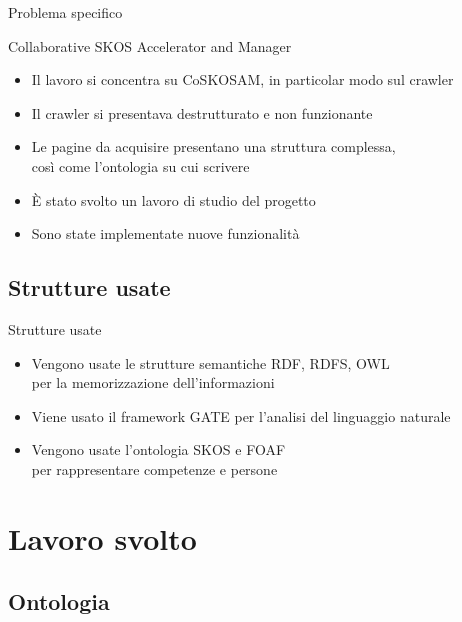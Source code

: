 \documentclass[dvips, 11pt]{beamer}
\begin{document}
\begin{frame}{Problema specifico}
  \begin{block}{Collaborative SKOS Accelerator and Manager}
    
  \end{block}
  \begin{itemize}
  \item Il lavoro si concentra su \alert{CoSKOSAM}, in particolar modo sul \alert{crawler}
    \pause
  \item Il crawler si presentava destrutturato e non funzionante
    \pause
  \item Le pagine da acquisire presentano una struttura complessa,\\
    cos\`i come l'ontologia su cui scrivere
    \pause
  \item \`E stato svolto un lavoro di \alert{studio} del progetto
    \pause
  \item Sono state implementate \alert{nuove funzionalit\`a}
  \end{itemize}
\end{frame}

\subsection{Strutture usate}

\begin{frame}{Strutture usate}
  \begin{itemize}
  \item Vengono usate le strutture semantiche \alert{RDF}, \alert{RDFS}, \alert{OWL}\\
    per la memorizzazione dell'informazioni
    \pause
  \item Viene usato il \alert{framework GATE} per l'analisi del linguaggio naturale
    \pause
  \item Vengono usate l'ontologia \alert{SKOS} e \alert{FOAF}\\
    per rappresentare competenze e persone 
  \end{itemize}
\end{frame}

\section{Lavoro svolto}

\subsection{Ontologia}
\end{document}
